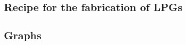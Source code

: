 \documentclass[11pt, openright]{book}
\begin{document}
        

        \subsection*{Recipe for the fabrication of LPGs}

        \subsection*{Graphs}

\end{document}
